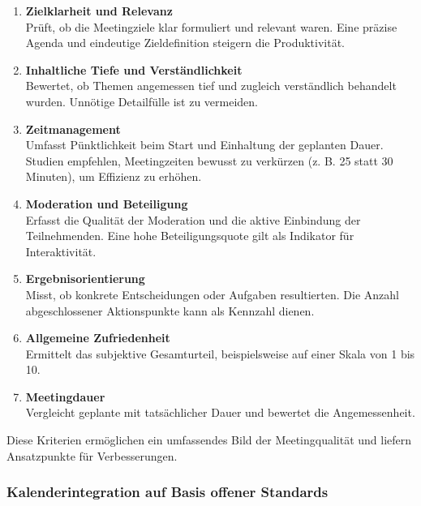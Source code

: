 \documentclass[12pt,a4paper]{report}
\begin{document}
\begin{enumerate}
    \item \textbf{Zielklarheit und Relevanz} \\
    Prüft, ob die Meetingziele klar formuliert und relevant waren. Eine präzise Agenda und eindeutige Zieldefinition steigern die Produktivität.

    \item \textbf{Inhaltliche Tiefe und Verständlichkeit} \\
    Bewertet, ob Themen angemessen tief und zugleich verständlich behandelt wurden. Unnötige Detailfülle ist zu vermeiden.

    \item \textbf{Zeitmanagement} \\
    Umfasst Pünktlichkeit beim Start und Einhaltung der geplanten Dauer. Studien empfehlen, Meetingzeiten bewusst zu verkürzen (z. B. 25 statt 30 Minuten), um Effizienz zu erhöhen.

    \item \textbf{Moderation und Beteiligung} \\
    Erfasst die Qualität der Moderation und die aktive Einbindung der Teilnehmenden. Eine hohe Beteiligungsquote gilt als Indikator für Interaktivität.

    \item \textbf{Ergebnisorientierung} \\
    Misst, ob konkrete Entscheidungen oder Aufgaben resultierten. Die Anzahl abgeschlossener Aktionspunkte kann als Kennzahl dienen.

    \item \textbf{Allgemeine Zufriedenheit} \\
    Ermittelt das subjektive Gesamturteil, beispielsweise auf einer Skala von 1 bis 10.

    \item \textbf{Meetingdauer} \\
    Vergleicht geplante mit tatsächlicher Dauer und bewertet die Angemessenheit.
\end{enumerate}

Diese Kriterien ermöglichen ein umfassendes Bild der Meetingqualität und liefern Ansatzpunkte für Verbesserungen.

\subsubsection{Kalenderintegration auf Basis offener Standards}
\end{document}
